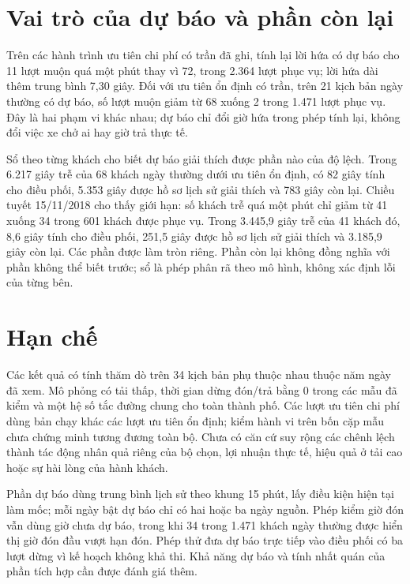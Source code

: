 \section{Vai trò của dự báo và phần còn lại}

Trên các hành trình ưu tiên chi phí có trần đã ghi, tính lại lời hứa có dự báo cho 11 lượt muộn quá một phút
thay vì 72, trong 2.364 lượt phục vụ; lời hứa dài thêm trung bình 7,30 giây. Đối với ưu tiên ổn định có trần,
trên 21 kịch bản ngày thường có dự báo, số lượt muộn giảm từ 68 xuống 2 trong 1.471 lượt phục vụ. Đây là
hai phạm vi khác nhau; dự báo chỉ đổi giờ hứa trong phép tính lại, không đổi việc xe chở ai hay giờ trả thực tế.

Sổ theo từng khách cho biết dự báo giải thích được phần nào của độ lệch. Trong 6.217 giây trễ của 68 khách
ngày thường dưới ưu tiên ổn định, có 82 giây tính cho điều phối, 5.353 giây được hồ sơ lịch sử giải thích và
783 giây còn lại. Chiều tuyết 15/11/2018 cho thấy giới hạn: số khách trễ quá một phút chỉ giảm từ 41 xuống
34 trong 601 khách được phục vụ. Trong 3.445,9 giây trễ của 41 khách đó, 8,6 giây tính cho điều phối, 251,5
giây được hồ sơ lịch sử giải thích và 3.185,9 giây còn lại. Các phần được làm tròn riêng. Phần còn lại không
đồng nghĩa với phần không thể biết trước; sổ là phép phân rã theo mô hình, không xác định lỗi của từng bên.

\section{Hạn chế}
\label{muc:c5-hanche}

Các kết quả có tính thăm dò trên 34 kịch bản phụ thuộc nhau thuộc năm ngày đã xem. Mô phỏng có tải thấp,
thời gian dừng đón/trả bằng 0 trong các mẫu đã kiểm và một hệ số tắc đường chung cho toàn thành phố.
Các lượt ưu tiên chi phí dùng bản chạy khác các lượt ưu tiên ổn định; kiểm hành vi trên bốn cặp mẫu chưa
chứng minh tương đương toàn bộ. Chưa có căn cứ suy rộng các chênh lệch thành tác động nhân quả riêng của
bộ chọn, lợi nhuận thực tế, hiệu quả ở tải cao hoặc sự hài lòng của hành khách.

Phần dự báo dùng trung bình lịch sử theo khung 15 phút, lấy điều kiện hiện tại làm mốc; mỗi ngày bật dự báo
chỉ có hai hoặc ba ngày nguồn. Phép kiểm giờ đón vẫn dùng giờ chưa dự báo, trong khi 34 trong 1.471 khách
ngày thường được hiển thị giờ đón đầu vượt hạn đón. Phép thử đưa dự báo trực tiếp vào điều phối có ba lượt
dừng vì kế hoạch không khả thi. Khả năng dự báo và tính nhất quán của phần tích hợp cần được đánh giá thêm.

